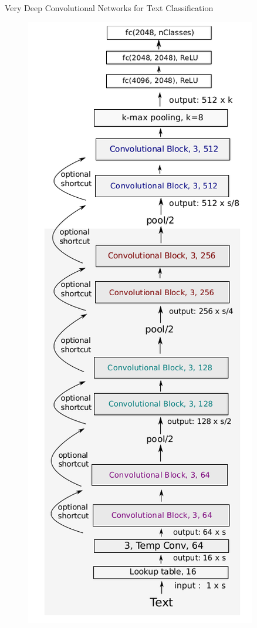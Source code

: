 \begin{frame}{Very Deep Convolutional Networks for Text Classification}

  \begin{figure}[h]
        	\includegraphics[scale = 0.2]{pics/VDCNN.png}
        \end{figure}

\end{frame}